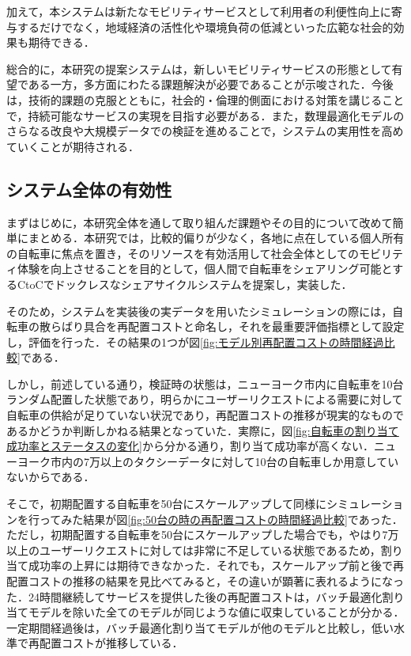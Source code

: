     \par 加えて，本システムは新たなモビリティサービスとして利用者の利便性向上に寄与するだけでなく，地域経済の活性化や環境負荷の低減といった広範な社会的効果も期待できる．
    \par 総合的に，本研究の提案システムは，新しいモビリティサービスの形態として有望である一方，多方面にわたる課題解決が必要であることが示唆された．今後は，技術的課題の克服とともに，社会的・倫理的側面における対策を講じることで，持続可能なサービスの実現を目指す必要がある．また，数理最適化モデルのさらなる改良や大規模データでの検証を進めることで，システムの実用性を高めていくことが期待される．
  
  \subsection{システム全体の有効性}
    \label{sec:システム全体の有効性}
      \par まずはじめに，本研究全体を通して取り組んだ課題やその目的について改めて簡単にまとめる．本研究では，比較的偏りが少なく，各地に点在している個人所有の自転車に焦点を置き，そのリソースを有効活用して社会全体としてのモビリティ体験を向上させることを目的として，個人間で自転車をシェアリング可能とするCtoCでドックレスなシェアサイクルシステムを提案し，実装した．
      \par そのため，システムを実装後の実データを用いたシミュレーションの際には，自転車の散らばり具合を再配置コストと命名し，それを最重要評価指標として設定し，評価を行った．その結果の1つが図\ref{fig:モデル別再配置コストの時間経過比較}である．
      \par しかし，前述している通り，検証時の状態は，ニューヨーク市内に自転車を10台ランダム配置した状態であり，明らかにユーザーリクエストによる需要に対して自転車の供給が足りていない状況であり，再配置コストの推移が現実的なものであるかどうか判断しかねる結果となっていた．実際に，図\ref{fig:自転車の割り当て成功率とステータスの変化}から分かる通り，割り当て成功率が高くない．ニューヨーク市内の7万以上のタクシーデータに対して10台の自転車しか用意していないからである．
      \par そこで，初期配置する自転車を50台にスケールアップして同様にシミュレーションを行ってみた結果が図\ref{fig:50台の時の再配置コストの時間経過比較}であった．ただし，初期配置する自転車を50台にスケールアップした場合でも，やはり7万以上のユーザーリクエストに対しては非常に不足している状態であるため，割り当て成功率の上昇には期待できなかった．それでも，スケールアップ前と後で再配置コストの推移の結果を見比べてみると，その違いが顕著に表れるようになった．24時間継続してサービスを提供した後の再配置コストは，バッチ最適化割り当てモデルを除いた全てのモデルが同じような値に収束していることが分かる．一定期間経過後は，バッチ最適化割り当てモデルが他のモデルと比較し，低い水準で再配置コストが推移している．
